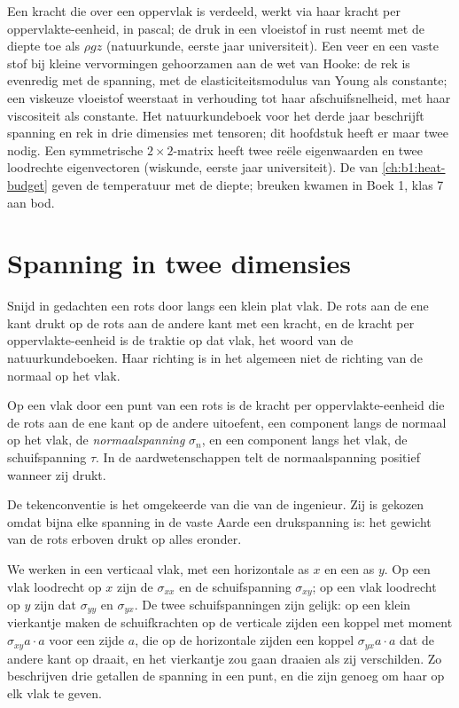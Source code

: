 \begin{recall}
Een kracht die over een oppervlak is verdeeld, werkt via haar kracht per oppervlakte-eenheid, in pascal; de druk in een vloeistof in rust neemt met de diepte toe als $\rho g z$ (natuurkunde, eerste jaar universiteit). Een veer en een vaste stof bij kleine vervormingen gehoorzamen aan de wet van Hooke: de rek is evenredig met de spanning, met de elasticiteitsmodulus van Young als constante; een viskeuze vloeistof weerstaat in verhouding tot haar afschuifsnelheid, met haar viscositeit als constante. Het natuurkundeboek voor het derde jaar beschrijft spanning en rek in drie dimensies met tensoren; dit hoofdstuk heeft er maar twee nodig. Een symmetrische $2\times2$-matrix heeft twee reële eigenwaarden en twee loodrechte eigenvectoren (wiskunde, eerste jaar universiteit). De  van \cref{ch:b1:heat-budget} geven de temperatuur met de diepte; breuken kwamen in Boek 1, klas 7 aan bod.
\end{recall}

\section{Spanning in twee dimensies}\label{sec:b1:stress-strain-rheology:stress}

Snijd in gedachten een rots door langs een klein plat vlak. De rots aan de ene kant drukt op de rots aan de andere kant met een kracht, en de kracht per oppervlakte-eenheid is de traktie op dat vlak, het woord van de natuurkundeboeken. Haar richting is in het algemeen niet de richting van de normaal op het vlak.

\begin{definition}[Normaalspanning]\label{def:b1:stress-strain-rheology:stress}
Op een vlak door een punt van een rots is de kracht per oppervlakte-eenheid die de rots aan de ene kant op de andere uitoefent, een component langs de normaal op het vlak, de \emph{normaalspanning} $\sigma_n$, en een component langs het vlak, de schuifspanning $\tau$. In de aardwetenschappen telt de normaalspanning positief wanneer zij drukt.
\end{definition}

De tekenconventie is het omgekeerde van die van de ingenieur. Zij is gekozen omdat bijna elke spanning in de vaste Aarde een drukspanning is: het gewicht van de rots erboven drukt op alles eronder.

We werken in een verticaal vlak, met een horizontale as $x$ en een as $y$. Op een vlak loodrecht op $x$ zijn de  $\sigma_{xx}$ en de schuifspanning $\sigma_{xy}$; op een vlak loodrecht op $y$ zijn dat $\sigma_{yy}$ en $\sigma_{yx}$. De twee schuifspanningen zijn gelijk: op een klein vierkantje maken de schuifkrachten op de verticale zijden een koppel met moment $\sigma_{xy}a\cdot a$ voor een zijde $a$, die op de horizontale zijden een koppel $\sigma_{yx}a\cdot a$ dat de andere kant op draait, en het vierkantje zou gaan draaien als zij verschilden. Zo beschrijven drie getallen de spanning in een punt, en die zijn genoeg om haar op elk vlak te geven.

